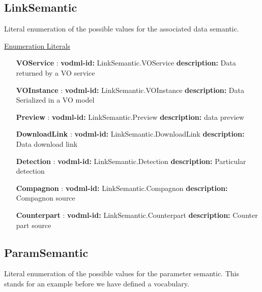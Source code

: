   \subsection{LinkSemantic}
  \label{sect:LinkSemantic}

  Literal enumeration of the possible values for the associated data semantic. 

  \noindent \underline{Enumeration Literals}
  \vspace{-\parsep}
  \small
  \begin{itemize}
  
    \item[\textbf{VOService}]: \textbf{vodml-id:} LinkSemantic.VOService \newline
          \textbf{description:} Data returned by a VO service
    \item[\textbf{VOInstance}]: \textbf{vodml-id:} LinkSemantic.VOInstance \newline
          \textbf{description:} Data Serialized in a VO model
    \item[\textbf{Preview}]: \textbf{vodml-id:} LinkSemantic.Preview \newline
          \textbf{description:} data preview
    \item[\textbf{DownloadLink}]: \textbf{vodml-id:} LinkSemantic.DownloadLink \newline
          \textbf{description:} Data download link
    \item[\textbf{Detection}]: \textbf{vodml-id:} LinkSemantic.Detection \newline
          \textbf{description:} Particular detection
    \item[\textbf{Compagnon}]: \textbf{vodml-id:} LinkSemantic.Compagnon \newline
          \textbf{description:} Compagnon source
    \item[\textbf{Counterpart}]: \textbf{vodml-id:} LinkSemantic.Counterpart \newline
          \textbf{description:} Counter part source
  \end{itemize}
  \normalsize


  \subsection{ParamSemantic}
  \label{sect:ParamSemantic}

  Literal enumeration of the possible values for the parameter semantic. This stands for an example before we have defined a vocabulary.

